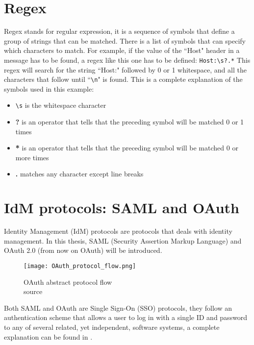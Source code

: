 \section{Regex}
Regex stands for regular expression, it is a sequence of symbols that define a group of strings that can be matched. There is a list of symbols that can specify which characters to match. For example, if the value of the ``Host" header in a message has to be found, a regex like this one has to be defined: \verb|Host:\s?.*|
This regex will search for the string ``Host:" followed by 0 or 1 whitespace, and all the characters that follow until ``\verb|\n|" is found. This is a complete explanation of the symbols used in this example:
\begin{itemize}
    \item \verb|\s| is the whitespace character
    \item \textbf{?} is an operator that tells that the preceding symbol will be matched 0 or 1 times
    \item \textbf{*} is an operator that tells that the preceding symbol will be matched 0 or more times
    \item \textbf{.} matches any character except line breaks
\end{itemize}

\section{IdM protocols: SAML and OAuth}
Identity Management (IdM) protocols are protocols that deals with identity management. In this thesis, \gls{SAML} (Security Assertion Markup Language) and \gls{OAuth} 2.0 (from now on \gls{OAuth}) will be introduced.
\begin{wrapfigure}{r}{0.5\textwidth}
    \texttt{[image: OAuth\_protocol\_flow.png]}
    \caption{OAuth abstract protocol flow\\source \cite{ietf_oauth2}}
    \label{fig:OAuth_protocol_flow}
\end{wrapfigure}
Both \Gls{SAML} and \gls{OAuth} are Single Sign-On (SSO) protocols, they follow an authentication scheme that allows a user to log in with a single ID and password to any of several related, yet independent, software systems, a complete explanation can be found in \cite{claudio_grisenti}. 

